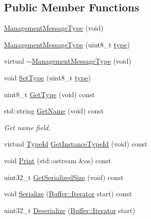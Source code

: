\subsection*{Public Member Functions}
\begin{DoxyCompactItemize}
\item 
\hyperlink{classns3_1_1ManagementMessageType_ad247d26b93a772b4b16bd7a0280bf716}{Management\+Message\+Type} (void)
\item 
\hyperlink{classns3_1_1ManagementMessageType_abb8147a9b25dea9b0b8eec66df487e40}{Management\+Message\+Type} (uint8\+\_\+t \hyperlink{visualizer-ideas_8txt_add98db9e15e2a58cf2b57623e7aa893a}{type})
\item 
virtual \hyperlink{classns3_1_1ManagementMessageType_a1f8a9bd27c2640b813675a3a065fa210}{$\sim$\+Management\+Message\+Type} (void)
\item 
void \hyperlink{classns3_1_1ManagementMessageType_ae4dd921fb282538130c4c3e6f054b27a}{Set\+Type} (uint8\+\_\+t \hyperlink{visualizer-ideas_8txt_add98db9e15e2a58cf2b57623e7aa893a}{type})
\item 
uint8\+\_\+t \hyperlink{classns3_1_1ManagementMessageType_a76f30e332f1bd1a21f62c29ce2fbb9c8}{Get\+Type} (void) const 
\item 
std\+::string \hyperlink{classns3_1_1ManagementMessageType_ab71a0a1ae24c4046e92f68cf1832a022}{Get\+Name} (void) const 
\begin{DoxyCompactList}\small\item\em Get name field. \end{DoxyCompactList}\item 
virtual \hyperlink{classns3_1_1TypeId}{Type\+Id} \hyperlink{classns3_1_1ManagementMessageType_a763b82b9c2e56c1e4d4ca65f51143a5c}{Get\+Instance\+Type\+Id} (void) const 
\item 
void \hyperlink{classns3_1_1ManagementMessageType_af2d7b1b6940b2ea9fa2b0685e1c57d94}{Print} (std\+::ostream \&os) const 
\item 
uint32\+\_\+t \hyperlink{classns3_1_1ManagementMessageType_a926ec579d00d5513cd9026fee0f6dc1d}{Get\+Serialized\+Size} (void) const 
\item 
void \hyperlink{classns3_1_1ManagementMessageType_a9a4643b6dfcb4bbe94cad2f25b6bc61c}{Serialize} (\hyperlink{classns3_1_1Buffer_1_1Iterator}{Buffer\+::\+Iterator} start) const 
\item 
uint32\+\_\+t \hyperlink{classns3_1_1ManagementMessageType_af3d7f3bbe5177ac2be70a32aef5a8a95}{Deserialize} (\hyperlink{classns3_1_1Buffer_1_1Iterator}{Buffer\+::\+Iterator} start)
\end{DoxyCompactItemize}
